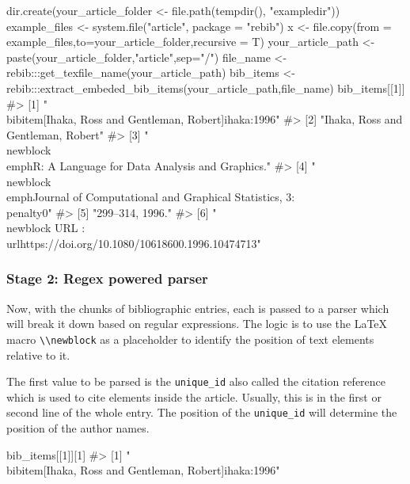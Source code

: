 \begin{Sinput}
dir.create(your_article_folder <- file.path(tempdir(), "exampledir"))
example_files <-  system.file("article", package = "rebib")
x <- file.copy(from = example_files,to=your_article_folder,recursive = T)
your_article_path <- paste(your_article_folder,"article",sep="/")
file_name <- rebib:::get_texfile_name(your_article_path)
bib_items <- rebib:::extract_embeded_bib_items(your_article_path,file_name)
bib_items[[1]]
#> [1] "\\bibitem[Ihaka, Ross and Gentleman, Robert]{ihaka:1996}"                          
#> [2] "Ihaka, Ross and Gentleman, Robert"                                                 
#> [3] "\\newblock \\emph{R: A Language for Data Analysis and Graphics.}"                  
#> [4] "\\newblock \\emph{Journal of Computational and Graphical Statistics}, 3:\\penalty0"
#> [5] "299--314, 1996."                                                                   
#> [6] "\\newblock URL : \\url{https://doi.org/10.1080/10618600.1996.10474713}"
\end{Sinput}


\subsubsection{Stage 2: Regex powered parser}


Now, with the chunks of bibliographic entries, each is passed to a parser which will break it down based on regular expressions.
The logic is to use the LaTeX macro \verb|\\newblock| as a placeholder to identify the position of text elements relative to it.

The first value to be parsed is the \verb|unique_id| also called the citation reference which is used to cite elements inside the article. Usually, this is in the first or second line of the whole entry. The position of the 
\verb|unique_id| will determine the position of the author names.

\begin{Soutput}
bib_items[[1]][1]
#> [1] "\\bibitem[Ihaka, Ross and Gentleman, Robert]{ihaka:1996}"
\end{Soutput}

